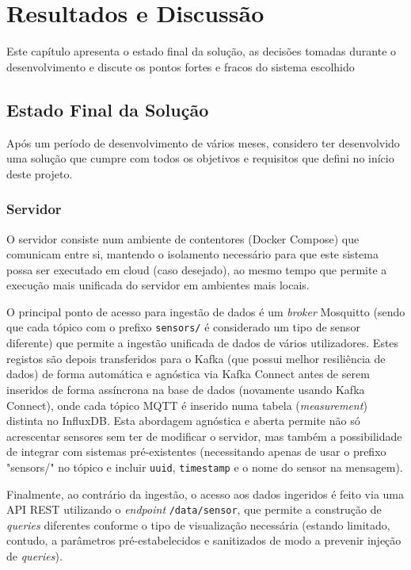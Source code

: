 \chapter{Resultados e Discussão}
\label{chap:resultados}

\begin{introduction}
Este capítulo apresenta o estado final da solução, as decisões tomadas durante o desenvolvimento e discute os pontos fortes e fracos do sistema escolhido
\end{introduction}

\section{Estado Final da Solução}

Após um período de desenvolvimento de vários meses, considero ter desenvolvido uma solução que cumpre com todos os objetivos e requisitos que defini no início deste projeto.

\subsection{Servidor}

O servidor consiste num ambiente de contentores (Docker Compose) que comunicam entre si, mantendo o isolamento necessário para que este sistema possa ser executado em cloud (caso desejado), ao mesmo tempo que permite a execução mais unificada do servidor em ambientes mais locais.

O principal ponto de acesso para ingestão de dados é um \textit{broker} Mosquitto (sendo que cada tópico com o prefixo \texttt{sensors/} é considerado um tipo de sensor diferente) que permite a ingestão unificada de dados de vários utilizadores. Estes registos são depois transferidos para o Kafka (que possui melhor resiliência de dados) de forma automática e agnóstica via Kafka Connect antes de serem inseridos de forma assíncrona na base de dados (novamente usando Kafka Connect), onde cada tópico \ac{MQTT} é inserido numa tabela (\textit{measurement}) distinta no InfluxDB. Esta abordagem agnóstica e aberta permite não só acrescentar sensores sem ter de modificar o servidor, mas também a possibilidade de integrar com sistemas pré-existentes (necessitando apenas de usar o prefixo "sensors/" no tópico e incluir \texttt{uuid}, \texttt{timestamp} e o nome do sensor na mensagem).

Finalmente, ao contrário da ingestão, o acesso aos dados ingeridos é feito via uma API REST utilizando o \textit{endpoint} \texttt{/data/{sensor}}, que permite a construção de \textit{queries} diferentes conforme o tipo de visualização necessária (estando limitado, contudo, a parâmetros pré-estabelecidos e sanitizados de modo a prevenir injeção de \textit{queries}).

